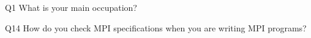 \begin{description}%
\item{Q1} What is your main occupation?%
\item{Q14} How do you check MPI specifications when you are writing MPI programs?%
\end{description}%
